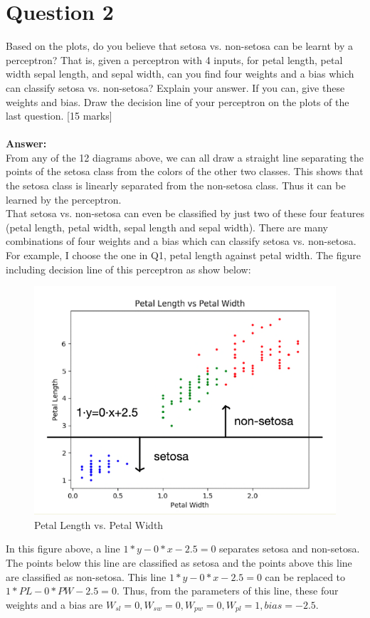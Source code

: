 \documentclass{article}
\begin{document}
\section{Question 2}
Based on the plots, do you believe that setosa vs. non-setosa can be learnt by a perceptron? That is, given a perceptron with 4 inputs, for petal length, petal width sepal length, and sepal width, can you find four weights and a bias which can classify setosa vs. non-setosa? Explain your answer. If you can, give these weights and bias. Draw the decision line of your perceptron on the plots of the last question.
[15 marks]\\\\
\textbf{Answer:}\\
From any of the 12 diagrams above, we can all draw a straight line separating the points of the setosa class from the colors of the other two classes. This shows that the setosa class is linearly separated from the non-setosa class. Thus it can be learned by the perceptron.\\
That setosa vs. non-setosa can even be classified by just two of these four features (petal length, petal width, sepal length and sepal width). There are many combinations of four weights and a bias which can classify setosa vs. non-setosa. For example, I choose the one in Q1, petal length against petal width. The figure including decision line of this perceptron as show below:\\
\begin{figure}[H]
\centering
\includegraphics[scale=0.4]{./img/PLvsPW.png}
\caption{Petal Length vs. Petal Width}
\end{figure}
\noindent
In this figure above, a line $1*y-0*x-2.5=0$ separates setosa and non-setosa. The points below this line are classified as setosa and the points above this line are classified as non-setosa. This line $1*y-0*x-2.5=0$ can be replaced to $1*PL-0*PW-2.5=0$. Thus, from the parameters of this line, these four weights and a bias are $W_{sl}=0, W_{sw}=0, W_{pw}=0, W_{pl}=1, bias=-2.5$.
\end{document}
